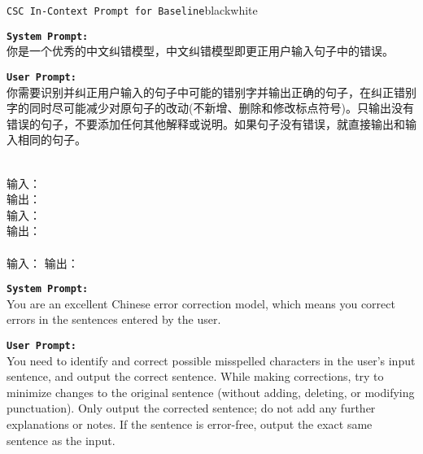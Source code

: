 \begin{figure*}[p!]
    \captionsetup[subfigure]{skip=0pt}
    \centering%
    \begin{promptbox}{\texttt{CSC In-Context Prompt for Baseline}}{black}{white}
        \footnotesize{
            \textbf{\texttt{System Prompt:}}\\
            你是一个优秀的中文纠错模型，中文纠错模型即更正用户输入句子中的错误。\return

            \textbf{\texttt{User Prompt:}}\\
            你需要识别并纠正用户输入的句子中可能的错别字并输出正确的句子，在纠正错别字的同时尽可能减少对原句子的改动(不新增、删除和修改标点符号)。只输出没有错误的句子，不要添加任何其他解释或说明。如果句子没有错误，就直接输出和输入相同的句子。\return\return

            \return\\
            输入：\return\\
            输出：\return\return\\
            输入：\return\\
            输出：\return\return\\
            \return\return\\

            输入：\return
            输出：
        }
        \tcblower
        \scriptsize
        \textbf{\texttt{System Prompt:}}\\
        You are an excellent Chinese error correction model, which means you correct errors in the sentences entered by the user.\return

        \textbf{\texttt{User Prompt:}}\\
        You need to identify and correct possible misspelled characters in the user's input sentence, and output the correct sentence. While making corrections, try to minimize changes to the original sentence (without adding, deleting, or modifying punctuation). Only output the corrected sentence; do not add any further explanations or notes. If the sentence is error-free, output the exact same sentence as the input.\return


\end{promptbox}
\end{figure*}
